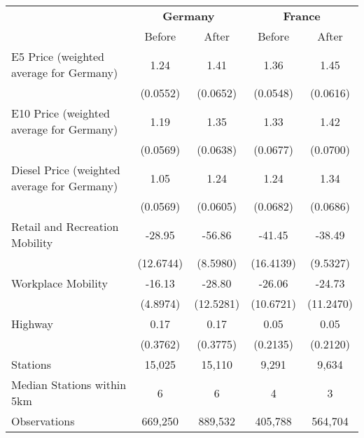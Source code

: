 \begin{tabular}{l*{4}{c}}
\toprule
                    &\multicolumn{2}{c}{\textbf{Germany}}&\multicolumn{2}{c}{\textbf{France}}\\\cmidrule(lr){2-3}\cmidrule(lr){4-5}
                    &\multicolumn{1}{c}{Before}&\multicolumn{1}{c}{After}&\multicolumn{1}{c}{Before}&\multicolumn{1}{c}{After}\\
\midrule
E5 Price (weighted average for Germany)&        1.24&        1.41&        1.36&        1.45\\
                    &    (0.0552)&    (0.0652)&    (0.0548)&    (0.0616)\\
E10 Price (weighted average for Germany)&        1.19&        1.35&        1.33&        1.42\\
                    &    (0.0569)&    (0.0638)&    (0.0677)&    (0.0700)\\
Diesel Price (weighted average for Germany)&        1.05&        1.24&        1.24&        1.34\\
                    &    (0.0569)&    (0.0605)&    (0.0682)&    (0.0686)\\
Retail and Recreation Mobility&      -28.95&      -56.86&      -41.45&      -38.49\\
                    &   (12.6744)&    (8.5980)&   (16.4139)&    (9.5327)\\
Workplace Mobility  &      -16.13&      -28.80&      -26.06&      -24.73\\
                    &    (4.8974)&   (12.5281)&   (10.6721)&   (11.2470)\\
Highway             &        0.17&        0.17&        0.05&        0.05\\
                    &    (0.3762)&    (0.3775)&    (0.2135)&    (0.2120)\\
\midrule
Stations            &      15,025&      15,110&       9,291&       9,634\\
Median Stations within 5km&           6&           6&           4&           3\\
Observations        &     669,250&     889,532&     405,788&     564,704\\
\bottomrule
\end{tabular}
